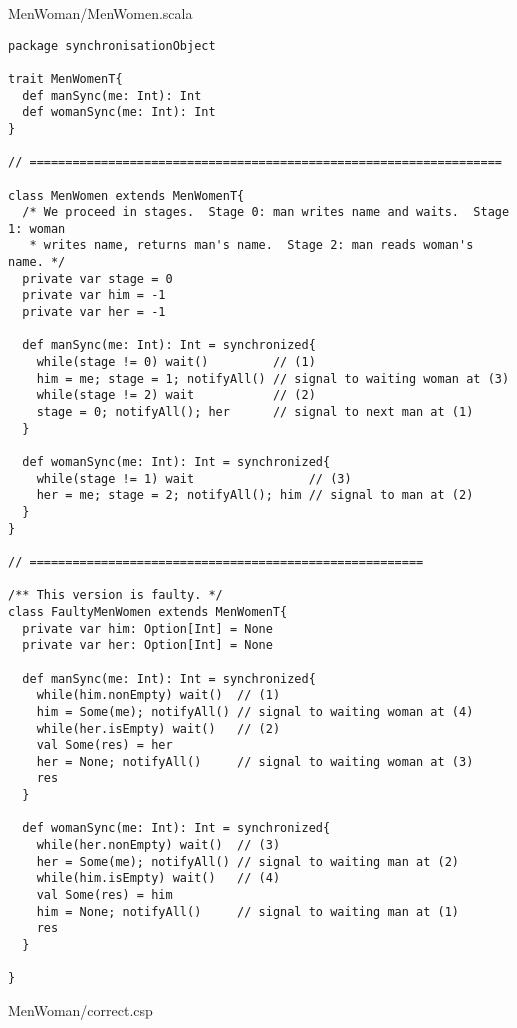 MenWoman/MenWomen.scala
\begin{lstlisting}
package synchronisationObject

trait MenWomenT{
  def manSync(me: Int): Int
  def womanSync(me: Int): Int
}

// ==================================================================

class MenWomen extends MenWomenT{
  /* We proceed in stages.  Stage 0: man writes name and waits.  Stage 1: woman
   * writes name, returns man's name.  Stage 2: man reads woman's name. */
  private var stage = 0
  private var him = -1
  private var her = -1

  def manSync(me: Int): Int = synchronized{
    while(stage != 0) wait()         // (1)
    him = me; stage = 1; notifyAll() // signal to waiting woman at (3)
    while(stage != 2) wait           // (2)
    stage = 0; notifyAll(); her      // signal to next man at (1)
  }

  def womanSync(me: Int): Int = synchronized{
    while(stage != 1) wait                // (3)
    her = me; stage = 2; notifyAll(); him // signal to man at (2)
  }
}

// =======================================================

/** This version is faulty. */
class FaultyMenWomen extends MenWomenT{
  private var him: Option[Int] = None
  private var her: Option[Int] = None

  def manSync(me: Int): Int = synchronized{
    while(him.nonEmpty) wait()  // (1)
    him = Some(me); notifyAll() // signal to waiting woman at (4)
    while(her.isEmpty) wait()   // (2)
    val Some(res) = her
    her = None; notifyAll()     // signal to waiting woman at (3)
    res
  }

  def womanSync(me: Int): Int = synchronized{
    while(her.nonEmpty) wait()  // (3)
    her = Some(me); notifyAll() // signal to waiting man at (2)
    while(him.isEmpty) wait()   // (4)
    val Some(res) = him
    him = None; notifyAll()     // signal to waiting man at (1)
    res
  }

}

\end{lstlisting}
MenWoman/correct.csp
